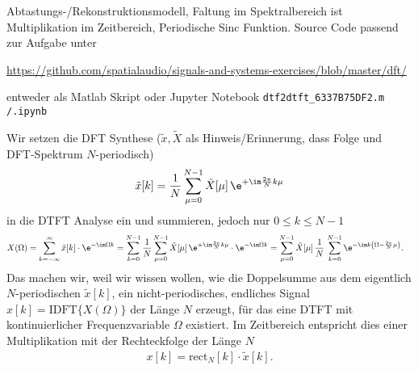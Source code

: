 \begin{Werkzeug}
Abtastungs-/Rekonstruktionsmodell, Faltung im Spektralbereich ist Multiplikation
im Zeitbereich, Periodische Sinc Funktion.
%
Source Code passend zur Aufgabe unter

\url{https://github.com/spatialaudio/signals-and-systems-exercises/blob/master/dft/}

entweder als Matlab Skript oder Jupyter Notebook
\texttt{dtf2dtft\_6337B75DF2.m /.ipynb}

\end{Werkzeug}
\begin{Ansatz}
Wir setzen die DFT Synthese ($\tilde{x}, \tilde{X}$ als Hinweis/Erinnerung, dass Folge und DFT-Spektrum $N$-periodisch)
%
\begin{equation}
\tilde{x}[k]=\frac{1}{N} \sum_{\mu=0}^{N-1}\tilde{X}[\mu]\,\e^{+\im\frac{2\pi}{N}k\mu}
\end{equation}
%
in die DTFT Analyse ein und summieren, jedoch nur $0 \leq k \leq N-1$
\begin{align}
X(\Omega)&=\sum_{k=-\infty}^\infty \tilde{x}[k]\cdot\e^{-\im\Omega k}
=\sum_{k=0}^{N-1}\frac{1}{N}\sum_{\mu=0}^{N-1}\tilde{X}[\mu]\,\e^{+\im\frac{2\pi}{N}k\mu}\cdot\e^{-\im\Omega k}
=\sum_{\mu=0}^{N-1}\tilde{X}[\mu]\,\frac{1}{N}\,\sum_{k=0}^{N-1}\e^{-\im k\left(\Omega-\frac{2\pi}{N}\mu\right)}.
\end{align}
%
Das machen wir, weil wir wissen wollen, wie die Doppelsumme
aus dem eigentlich $N$-periodischen $\tilde{x}[k]$,
ein nicht-periodisches, endliches Signal $x[k] = \mathrm{IDFT}\{X(\Omega)\}$ der Länge $N$ erzeugt,
für das eine DTFT mit kontinuierlicher Frequenzvariable $\Omega$ existiert.
%
Im Zeitbereich entspricht dies einer Multiplikation mit der Rechteckfolge der Länge $N$
\begin{align}
x[k] = \mathrm{rect}_N[k] \cdot \tilde{x}[k].
\end{align}


\end{Ansatz}
